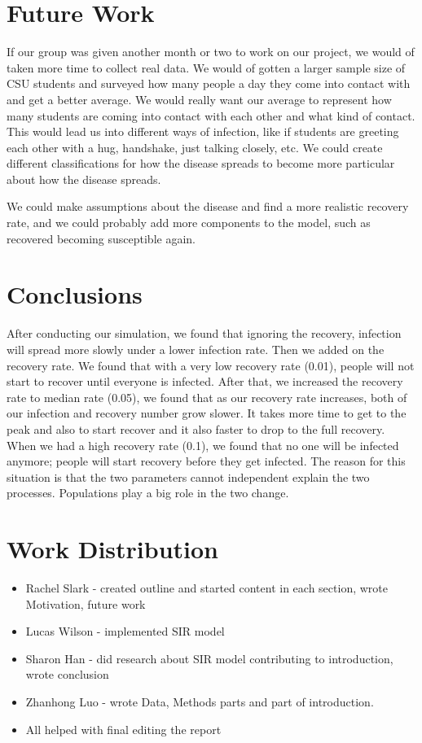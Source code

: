 \documentclass[12pt]{article}
\begin{document}
\section{Future Work}
If our group was given another month or two to work on our project, we would of taken more time to collect real data. We would of gotten a larger sample size of CSU students and surveyed how many people a day they come into contact with and get a better average. We would really want our average to represent how many students are coming into contact with each other and what kind of contact. This would lead us into different ways of infection, like if students are greeting each other with a hug, handshake, just talking closely, etc. We could create different classifications for how the disease spreads to become more particular about how the disease spreads.

We could make assumptions about the disease and find a more realistic recovery rate, and we could probably add more components to the model, such as recovered becoming susceptible again.

\section{Conclusions}
After conducting our simulation, we found that ignoring the recovery, infection will spread more slowly under a lower infection rate. Then we added on the recovery rate. We found that with a very low recovery rate (0.01), people will not start to recover until everyone is infected. After that, we increased the recovery rate to median rate (0.05), we found that as our recovery rate increases, both of our infection and recovery number grow slower. It takes more time to get to the peak and also to start recover and it also faster to drop to the full recovery. When we had a high recovery rate (0.1), we found that no one will be infected anymore; people will start recovery before they get infected. The reason for this situation is that the two parameters cannot independent explain the two processes. Populations play a big role in the two change.


\section{Work Distribution}

\begin{itemize}
    \item Rachel Slark - created outline and started content in each section, wrote Motivation, future work
    \item Lucas Wilson - implemented SIR model
    \item Sharon Han - did research about SIR model contributing to introduction, wrote conclusion
    \item Zhanhong Luo -  wrote Data, Methods parts and part of introduction.
    \item All helped with final editing the report
\end{itemize}

 

\end{document}
